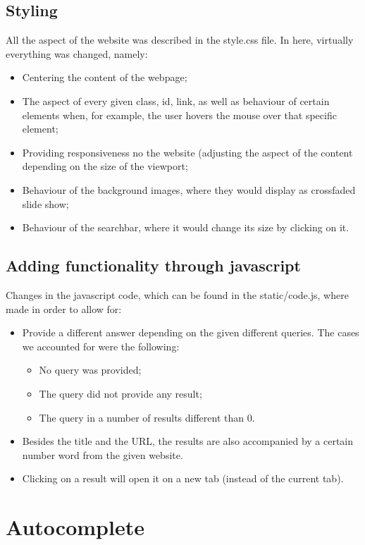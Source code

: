 \subsection{Styling}
All the aspect of the website was described in the style.css file. In here, virtually everything was changed, namely:
\begin{itemize}
    \item Centering the content of the webpage;
    \item The aspect of every given class, id, link, as well as behaviour of certain elements when, for example, the user hovers the mouse over that specific element;
    \item Providing responsiveness no the website (adjusting the aspect of the content depending on the size of the viewport;
    \item Behaviour of the background images, where they would display as crossfaded slide show;
    \item Behaviour of the searchbar, where it would change its size by clicking on it.
\end{itemize}

\subsection{Adding functionality through javascript}
Changes in the javascript code, which can be found in the static/code.js, where made in order to allow for:
\begin{itemize}
    \item Provide a different answer depending on the given different queries. The cases we accounted for were the following:
    \begin{itemize}
        \item No query was provided;
        \item The query did not provide any result;
        \item The query in a number of results different than $0$.
    \end{itemize}
    \item Besides the title and the URL, the results are also accompanied by a certain number word from the given website.
    \item Clicking on a result will open it on a new tab (instead of the current tab).
\end{itemize}

\section{Autocomplete}
